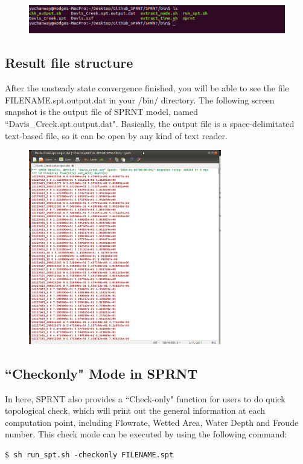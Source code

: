 \documentclass[12pt, letterpaper]{article}
\begin{document}
\begin{flushleft}
\begin{figure}[H]
	\centering
	\includegraphics[width = 1.0\textwidth]{figure/outputfile.png} %
	\label{fig:process}%
\end{figure}

\subsection{Result file structure}
After the unsteady state convergence finished, you will be able to see the file FILENAME.spt.output.dat in your /bin/ directory.
The following screen snapshot is the output file of SPRNT model, named ``Davis\_Creek.spt.output.dat". Basically, the output file is a space-delimitated text-based file, so it can be open by any kind of text reader.

\begin{figure}[H]
	\centering
	\includegraphics[width = 0.75\textwidth]{figure/outputfileformat.png} %
	\label{fig:process}%
\end{figure}

\subsection{``Checkonly" Mode in SPRNT}
In here, SPRNT also provides a ``Check-only" function for users to do quick topological check, which will print out the general information at each computation point, including Flowrate, Wetted Area, Water Depth and Froude number. This check mode can be executed by using the following command:
 
\begin{lstlisting}[frame=single]
$ sh run_spt.sh -checkonly FILENAME.spt
\end{lstlisting}

\newpage



\end{flushleft} %
\end{document}
